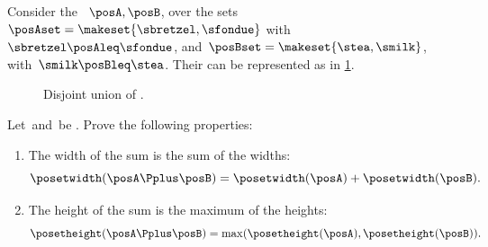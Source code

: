 \begin{example}
    Consider the ~$\posA,\posB$, over the sets~$\posAset=\makeset{\sbretzel, \sfondue}$ with~$\sbretzel \posAleq \sfondue$, and~$\posBset=\makeset{\stea,\smilk}$, with~$\smilk \posBleq \stea$.
    Their  can be represented as in \cref{fig:poset-coproduct}.
    \begin{figure}[h!]
        \centering
        \caption{Disjoint union of .}
        \label{fig:poset-coproduct}
    \end{figure}
\end{example}
\vfill
\begin{gradedexercise}
    \label{ex:MeasurePosetSum}
    Let~\posA and~\posB be .
    Prove the following properties:
    \begin{enumerate}
        \item The width of the sum is the sum of the widths:
              \begin{equation}\label{eq:MeasurePosetSum-1}
                  \posetwidth(\posA \Pplus \posB) = \posetwidth(\posA) + \posetwidth(\posB).
              \end{equation}
        \item The height of the sum is the maximum of the heights:
              \begin{equation}\label{eq:MeasurePosetSum-2}
                  \posetheight(\posA \Pplus \posB) = \max(\posetheight(\posA), \posetheight(\posB)).
              \end{equation}
    \end{enumerate}
\end{gradedexercise}
